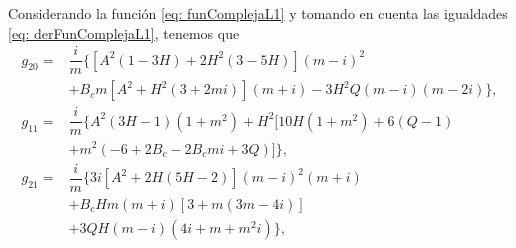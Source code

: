 \noindent Considerando la función \eqref{eq: funComplejaL1} y tomando en cuenta las igualdades \eqref{eq: derFunComplejaL1}, tenemos que
\begin{equation}
	\begin{aligned}
        g_{20} = & \dfrac{i}{m}\{[A^2(1 - 3H) + 2H^2(3 - 5H)](m-i)^2 \\ 
        & + B_cm[A^2 + H^2(3 + 2mi)](m+i) - 3H^2Q(m-i)(m-2i) \}, \\
        g_{11} = & \dfrac{i}{m} \{A^2(3H-1)(1 + m^2) + H^2[10H(1 + m^2) + 6(Q-1) \\ 
        & + m^2(-6 + 2B_c - 2B_cmi + 3Q)]\}, \\
        g_{21} = & \dfrac{i}{m} \{3i[A^2 + 2H(5H-2)](m-i)^2(m+i) \\ 
        & + B_cHm(m+i)[3 + m(3m-4i)] \\ 
        & + 3QH(m-i)(4i + m + m^2i)\},
	\end{aligned}
	\label{eq: g_klModelo2}
\end{equation}

